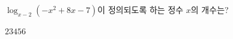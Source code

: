 $\log_{x-2} (-x^2+8x-7)$이 정의되도록 하는 정수 $x$의 개수는?
\begin{choices32}{$2$}{$3$}{$4$}{$5$}{$6$}\end{choices32}
